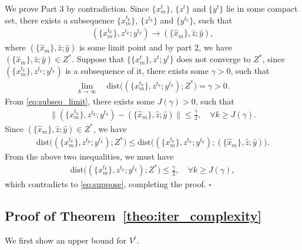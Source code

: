 We prove Part 3 by contradiction. Since $\{x_m^t\}$, $\{z^t\}$ and $\{y^t\}$ lie in some compact set, there exists a subsequence $\{x_m^{t_k}\}$, $\{z^{t_k}\}$ and $\{y^{t_k}\}$, such that
\begin{align}
    (\{x_m^{t_k}\}, z^{t_k}; y^{t_k})\rightarrow (\{\hat{x}_m\}, \hat{z}; \hat{y}), \label{eq:subseq_limit}
\end{align}
where $(\{\hat{x}_m\}, \hat{z}; \hat{y})$ is some limit point and by part 2, we have $(\{\hat{x}_m\}, \hat{z}; \hat{y})\in Z^*$. Suppose that $\{\{x_m^t\}, z^t; y^t\}$ does not converge to $Z^*$, since $(\{x_m^{t_k}\}, z^{t_k}; y^{t_k})$ is a subsequence of it, there exists some $\gamma>0$, such that
\begin{align}
    \underset{k\rightarrow\infty}{\lim}\quad\text{dist}\big((\{x_m^{t_k}\}, z^{t_k}; y^{t_k});Z^*\big)=\gamma>0.\label{eq:suppose}
\end{align}
From \eqref{eq:subseq_limit}, there exists some $J(\gamma)>0$, such that
\begin{align}
        \|(\{x_m^{t_k}\}, z^{t_k}; y^{t_k})- (\{\hat{x}_m\}, \hat{z}; \hat{y})\|\le\frac{\gamma}{2}, \quad\forall k\ge J(\gamma).
\end{align}
Since $(\{\hat{x}_m\}, \hat{z}; \hat{y})\in Z^*$, we have
\begin{align}
    \text{dist}\big((\{x_m^{t_k}\}, z^{t_k}; y^{t_k});Z^*\big) \le \text{dist}\big((\{x_m^{t_k}\}, z^{t_k}; y^{t_k});  (\{\hat{x}_m\}, \hat{z}; \hat{y})\big).
\end{align}
From the above two inequalities, we must have
\begin{align}
    \text{dist}\big((\{x_m^{t_k}\}, z^{t_k}; y^{t_k});Z^*\big)\le\frac{\gamma}{2},\quad\forall k\ge J(\gamma),
\end{align}
which contradicts to \eqref{eq:suppose}, completing the proof.
\hfill$\square$

\subsection{Proof of Theorem~\ref{theo:iter_complexity}}
We first show an upper bound for $V^t$.

